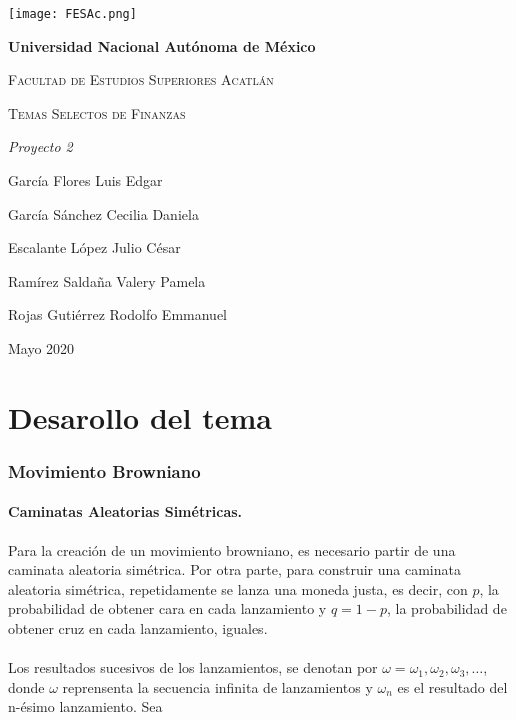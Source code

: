 \documentclass[11pt,notitlepage]{article}
\begin{document}
\begin{titlepage}
\centering
{ \texttt{[image: FESAc.png]}\par}
\vspace{1cm}
{\bfseries\LARGE Universidad Nacional Autónoma de México \par}
\vspace{0.8cm}
{\scshape\Large Facultad de Estudios Superiores Acatlán \par}
\vspace{2cm}
{\scshape\Huge Temas Selectos de Finanzas \par}
\vspace{2cm}
{\itshape\Large Proyecto 2 \par}
\vfill
{\Large García Flores Luis Edgar\par}
{\Large García Sánchez Cecilia Daniela \par}
{\Large Escalante López Julio César \par}
{\Large Ramírez Saldaña Valery Pamela \par}
{\Large Rojas Gutiérrez Rodolfo Emmanuel \par}

\vfill
{\Large Mayo 2020 \par}
\end{titlepage}
\newtheorem*{remark}{Observación}
\newtheorem{teor}{Teorema}[subsection]
\newtheorem{defi}{\textbf{\it\textbf{ Definición}}}[subsection]
\newtheorem{teo}{\textbf{\it\textbf{Teorema}}}[subsection]
\newtheorem{lema}{\textbf{\it\textbf{Lema}}} [subsection]
\tableofcontents
\clearpage
\part{Desarollo del tema}
\section{Movimiento Browniano}
\subsection{Caminatas Aleatorias Simétricas.}
Para la creación de un movimiento browniano, es necesario partir de una caminata aleatoria simétrica. Por otra parte, para construir una caminata aleatoria simétrica, repetidamente se lanza una moneda justa, es decir, con \(p\), la probabilidad de obtener cara en cada lanzamiento y \(q=1-p\), la probabilidad de obtener cruz en cada lanzamiento, iguales.
\\
\\
Los resultados sucesivos de los lanzamientos, se denotan por \(\omega=\omega_{1},\omega_{2},\omega_{3},\hdots\), donde \(\omega\) reprensenta la secuencia infinita de lanzamientos y \(\omega_{n}\) es el resultado del n-ésimo lanzamiento. Sea
\end{document}
